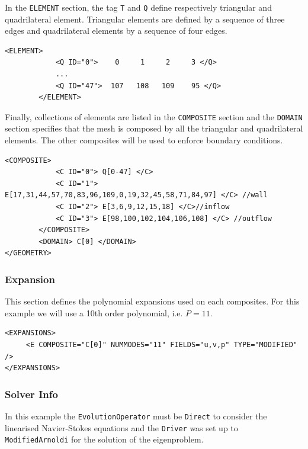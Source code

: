 In the \texttt{ELEMENT} section, the tag \texttt{T} and \texttt{Q} define respectively triangular and quadrilateral element. Triangular elements are defined by a sequence of three edges and quadrilateral elements by a sequence of four edges.

  \begin{lstlisting}[style=XMLStyle]
        <ELEMENT>
            <Q ID="0">    0     1     2     3 </Q>
            ...
            <Q ID="47">  107   108   109    95 </Q>
        </ELEMENT>
        \end{lstlisting}

Finally, collections of elements are listed in the \texttt{COMPOSITE} section and the \texttt{DOMAIN} section specifies that the mesh is composed by all the triangular and quadrilateral elements. The other composites will be used to enforce boundary conditions. 

  \begin{lstlisting}[style=XMLStyle]
              <COMPOSITE>            
            <C ID="0"> Q[0-47] </C>
            <C ID="1"> E[17,31,44,57,70,83,96,109,0,19,32,45,58,71,84,97] </C> //wall
            <C ID="2"> E[3,6,9,12,15,18] </C>//inflow 
            <C ID="3"> E[98,100,102,104,106,108] </C> //outflow
        </COMPOSITE>
        <DOMAIN> C[0] </DOMAIN>
</GEOMETRY>
  \end{lstlisting}
              
  \subsubsection{Expansion}
  
  This section defines the polynomial expansions used on each composites. For this example we will use a 10th order polynomial, i.e. $P=11$.
  
  \begin{lstlisting}[style=XMLStyle]
<EXPANSIONS>
     <E COMPOSITE="C[0]" NUMMODES="11" FIELDS="u,v,p" TYPE="MODIFIED" />
</EXPANSIONS>
  \end{lstlisting}
  
  \subsubsection{Solver Info}
  
  In this example the \texttt{EvolutionOperator} must be \texttt{Direct} to consider the linearised Navier-Stokes equations and the \texttt{Driver} was set up to \texttt{ModifiedArnoldi} for the solution of the eigenproblem. 
  
